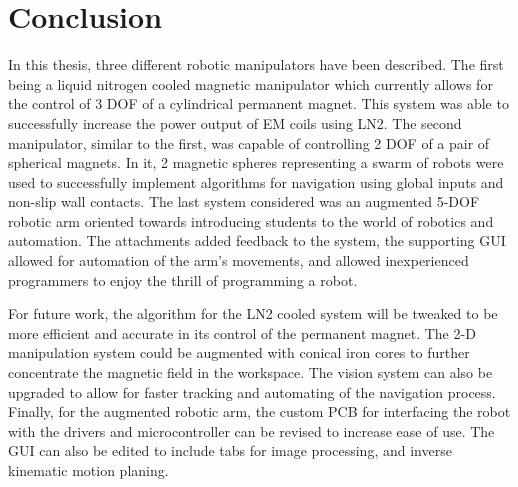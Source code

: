 
\chapter[Conclusion]{Conclusion}
\label{chap-conc}

In this thesis, three different robotic manipulators have been described. The first being a liquid nitrogen cooled magnetic manipulator which currently allows for the control of 3 DOF of a cylindrical permanent magnet. This system was able to successfully increase the power output of EM coils using LN2. The second manipulator, similar to the first, was capable of controlling 2 DOF of a pair of spherical magnets. In it, 2 magnetic spheres representing a swarm of robots were used to successfully implement algorithms  for navigation using global inputs and non-slip wall contacts. The last system considered was an augmented 5-DOF robotic arm oriented towards introducing students to the world of robotics and automation. The attachments added feedback to the system, the supporting GUI allowed for automation of the arm's movements,  and allowed inexperienced programmers to enjoy the thrill of programming a robot. 

For future work, the algorithm for the LN2 cooled system will be tweaked to be more efficient and accurate in its control of the permanent magnet. The 2-D manipulation system could be augmented with conical iron cores to further concentrate the magnetic field in the workspace. The vision system can also be upgraded to allow for faster tracking and automating of the navigation process. Finally, for the augmented robotic arm, the custom PCB for interfacing the robot with the drivers and microcontroller can be revised to increase ease of use. The GUI can also be edited to include tabs for image processing, and inverse kinematic motion planing. 




